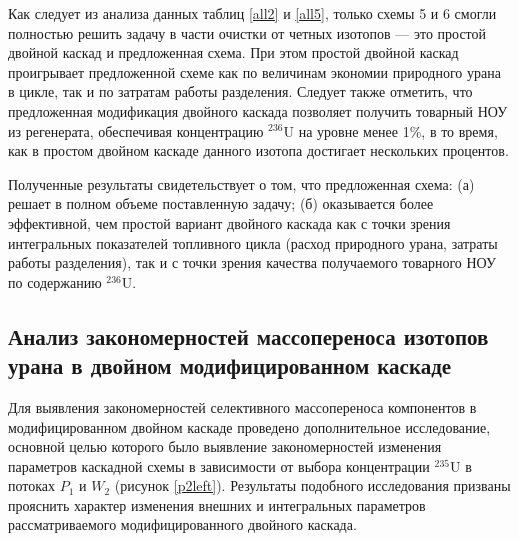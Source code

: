 Как следует из анализа данных таблиц \ref{all2} и \ref{all5}, только схемы 5 и 6 смогли полностью решить задачу в части очистки от четных изотопов --- это простой двойной каскад и предложенная схема. При этом простой двойной каскад проигрывает предложенной схеме как по величинам экономии природного урана в цикле, так и по затратам работы разделения. Следует также отметить, что предложенная модификация двойного каскада позволяет получить товарный НОУ из регенерата, обеспечивая концентрацию $^{236}$U на уровне менее 1\%, в то время, как в простом двойном каскаде данного изотопа достигает нескольких процентов. 

Полученные результаты свидетельствует о том, что предложенная схема: (а) решает в полном объеме поставленную задачу; (б) оказывается более эффективной, чем простой вариант двойного каскада как с точки зрения интегральных показателей топливного цикла (расход природного урана, затраты работы разделения), так и с точки зрения качества получаемого товарного НОУ по содержанию $^{236}$U.

\subsection{Анализ закономерностей массопереноса изотопов урана в двойном модифицированном каскаде}

Для выявления закономерностей селективного массопереноса компонентов в модифицированном двойном каскаде  проведено дополнительное исследование, основной целью которого было выявление закономерностей изменения параметров каскадной схемы в зависимости от выбора концентрации $^{235}$U в потоках $P_1$ и $W_2$ (рисунок \ref{p2left}). Результаты подобного исследования призваны прояснить характер изменения внешних и интегральных параметров рассматриваемого модифицированного двойного каскада.


